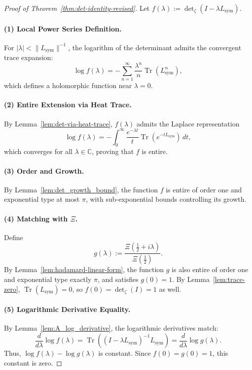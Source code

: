 \begin{proof}[Proof of Theorem~\ref{thm:det-identity-revised}]
Let \( f(\lambda) := \det\nolimits_\zeta(I - \lambda L_{\mathrm{sym}}) \).

\paragraph{(1) Local Power Series Definition.}
For \( |\lambda| < \|L_{\mathrm{sym}}\|^{-1} \), the logarithm of the determinant admits the convergent trace expansion:
\[
\log f(\lambda) = -\sum_{n=1}^\infty \frac{\lambda^n}{n} \operatorname{Tr}(L_{\mathrm{sym}}^n),
\]
which defines a holomorphic function near \( \lambda = 0 \).

\paragraph{(2) Entire Extension via Heat Trace.}
By Lemma~\ref{lem:det-via-heat-trace}, \( f(\lambda) \) admits the Laplace representation
\[
\log f(\lambda) = -\int_0^\infty \frac{e^{-\lambda t}}{t} \operatorname{Tr}(e^{-tL_{\mathrm{sym}}})\, dt,
\]
which converges for all \( \lambda \in \mathbb{C} \), proving that \( f \) is entire.

\paragraph{(3) Order and Growth.}
By Lemma~\ref{lem:det_growth_bound}, the function \( f \) is entire of order one and exponential type at most \( \pi \), with sub-exponential bounds controlling its growth.

\paragraph{(4) Matching with \( \Xi \).}
Define
\[
g(\lambda) := \frac{\Xi\left( \tfrac{1}{2} + i\lambda \right)}{\Xi\left( \tfrac{1}{2} \right)}.
\]
By Lemma~\ref{lem:hadamard-linear-form}, the function \( g \) is also entire of order one and exponential type exactly \( \pi \), and satisfies \( g(0) = 1 \). By Lemma~\ref{lem:trace-zero}, \( \operatorname{Tr}(L_{\mathrm{sym}}) = 0 \), so \( f(0) = \det\nolimits_\zeta(I) = 1 \) as well.

\paragraph{(5) Logarithmic Derivative Equality.}
By Lemma~\ref{lem:A_log_derivative}, the logarithmic derivatives match:
\[
\frac{d}{d\lambda} \log f(\lambda)
= \operatorname{Tr}\left( (I - \lambda L_{\mathrm{sym}})^{-1} L_{\mathrm{sym}} \right)
= \frac{d}{d\lambda} \log g(\lambda).
\]
Thus, \( \log f(\lambda) - \log g(\lambda) \) is constant. Since \( f(0) = g(0) = 1 \), this constant is zero.


\end{proof}
